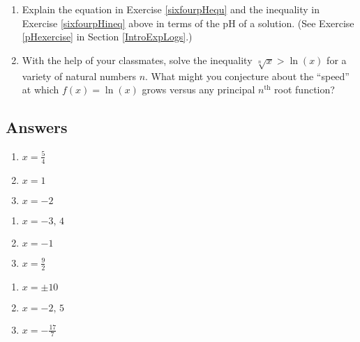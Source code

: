 \begin{enumerate}
\item Explain the equation in Exercise \ref{sixfourpHequ} and the inequality in Exercise \ref{sixfourpHineq} above in terms of the pH of a solution.  (See Exercise \ref{pHexercise} in Section \ref{IntroExpLogs}.)

\item With the help of your classmates, solve the inequality $\sqrt[n]{x} > \ln(x)$ for a variety of natural numbers $n$.  What might you conjecture about the ``speed'' at which $f(x) = \ln(x)$ grows versus any principal $n^{\textrm{th}}$ root function?

\end{enumerate}

\newpage

\subsection{Answers}
\begin{multicols}{3}
\begin{enumerate}

\item $x = \frac{5}{4}$
\item $x = 1$
\item $x=-2$

\setcounter{HW}{\value{enumi}}
\end{enumerate}
\end{multicols}

\begin{multicols}{3}
\begin{enumerate}
\setcounter{enumi}{\value{HW}}

\item $x=-3,\, 4$
\item $x=-1$
\item $x=\frac{9}{2}$

\setcounter{HW}{\value{enumi}}
\end{enumerate}
\end{multicols}

\begin{multicols}{3}
\begin{enumerate}
\setcounter{enumi}{\value{HW}}

\item $x=\pm 10$
\item $x=-2,\, 5$
\item $x = -\frac{17}{7}$

\setcounter{HW}{\value{enumi}}
\end{enumerate}
\end{multicols}

